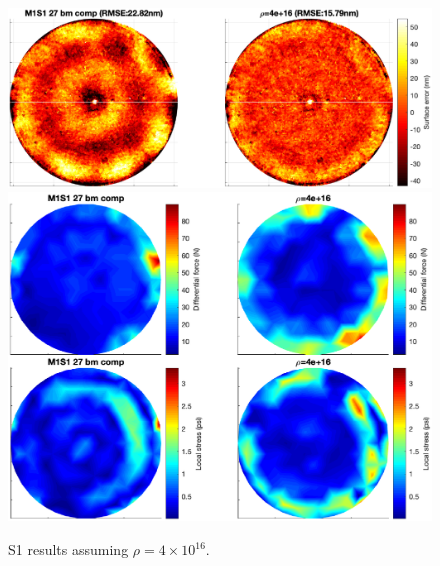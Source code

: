 \documentclass{gmto}
\begin{document}

\begin{figure}[!p]
\centering
\includegraphics[width=\textwidth]{./pictures/s1_surfaceRMSE_rho4e16.eps}
\vfill
\includegraphics[width=\textwidth]{./pictures/s1_NG_sigma_rho4e16.eps}
\caption{\textsf{S1} results assuming $\rho=4\times10^{16}$.}
\label{fig:s1_altrho_results}
\end{figure}
\end{document}
